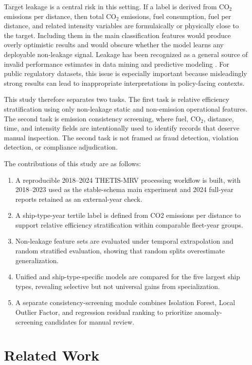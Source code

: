 \documentclass[jmse,article,submit,pdftex,oneauthor]{Definitions/mdpi}
\begin{document}
Target leakage is a central risk in this setting. If a label is derived from CO$_2$ emissions per distance, then total CO$_2$ emissions, fuel consumption, fuel per distance, and related intensity variables are formulaically or physically close to the target. Including them in the main classification features would produce overly optimistic results and would obscure whether the model learns any deployable non-leakage signal. Leakage has been recognized as a general source of invalid performance estimates in data mining and predictive modeling \cite{kaufman2012leakage}. For public regulatory datasets, this issue is especially important because misleadingly strong results can lead to inappropriate interpretations in policy-facing contexts.

This study therefore separates two tasks. The first task is relative efficiency stratification using only non-leakage static and non-emission operational features. The second task is emission consistency screening, where fuel, CO$_2$, distance, time, and intensity fields are intentionally used to identify records that deserve manual inspection. The second task is not framed as fraud detection, violation detection, or compliance adjudication.

The contributions of this study are as follows:
\begin{enumerate}
\item A reproducible 2018--2024 THETIS-MRV processing workflow is built, with 2018--2023 used as the stable-schema main experiment and 2024 full-year reports retained as an external-year check.
\item A ship-type-year tertile label is defined from CO2 emissions per distance to support relative efficiency stratification within comparable fleet-year groups.
\item Non-leakage feature sets are evaluated under temporal extrapolation and random stratified evaluation, showing that random splits overestimate generalization.
\item Unified and ship-type-specific models are compared for the five largest ship types, revealing selective but not universal gains from specialization.
\item A separate consistency-screening module combines Isolation Forest, Local Outlier Factor, and regression residual ranking to prioritize anomaly-screening candidates for manual review.
\end{enumerate}

\section{Related Work}
\end{document}
